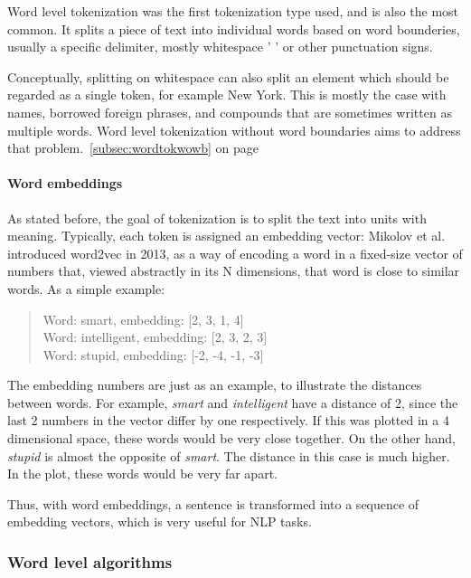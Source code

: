 Word level tokenization was the first tokenization type used, and is also the most common. It splits a piece of text into individual words based on word bounderies, usually a specific delimiter, mostly whitespace ' ' or other punctuation signs.

Conceptually, splitting on whitespace can also split an element which should be regarded as a single token, for example New York. This is mostly the case with names, borrowed foreign phrases, and compounds that are sometimes written as multiple words. Word level tokenization without word boundaries aims to address that problem.~\ref{subsec:wordtokwowb} on page~\pageref{subsec:wordtokwowb}

\paragraph{Word embeddings}\label{subsec:wordemb}

As stated before, the goal of tokenization is to split the text into units with meaning. Typically, each token is assigned an embedding vector: Mikolov et al. \cite{mikolov2013efficient} introduced word2vec in 2013, as a way of encoding a word in a fixed-size vector of numbers that, viewed abstractly in its N dimensions, that word is close to similar words. As a simple example:

\begin{quote}
    Word: smart, embedding: [2, 3, 1, 4]\\
    Word: intelligent, embedding: [2, 3, 2, 3]\\
    Word: stupid, embedding: [-2, -4, -1, -3]
\end{quote}

The embedding numbers are just as an example, to illustrate the distances between words. For example, \emph{smart} and \emph{intelligent} have a distance of 2, since the last 2 numbers in the vector differ by one respectively. If this was plotted in a 4 dimensional space, these words would be very close together. On the other hand, \emph{stupid} is almost the opposite of \emph{smart}. The distance in this case is much higher. In the plot, these words would be very far apart.

Thus, with word embeddings, a sentence is transformed into a sequence of embedding vectors, which is very useful for NLP tasks. 

\subsubsection{Word level algorithms}

